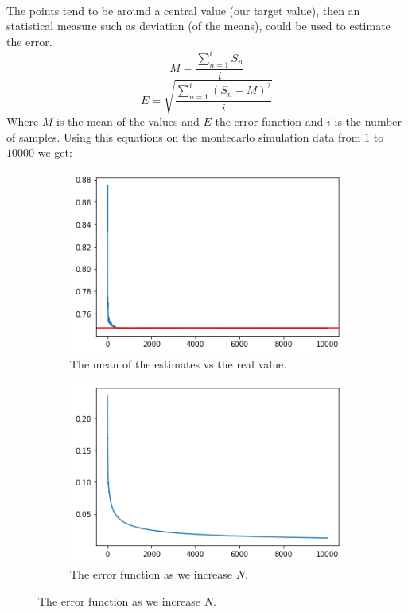 \documentclass{article}
\begin{document}
\paragraph{}The points tend to be around a central value (our target value), then an statistical measure such as deviation (of the means), could be used to estimate the error.
\begin{equation}
	M = \frac{\sum_{n=1}^{i}S_n}{i} 
\end{equation}
\begin{equation}
	E = \sqrt{\frac{\sum_{n=1}^{i} (S_n - M)^2}{i}}	
\end{equation}
Where $M$ is the mean of the values and $E$ the error function and $i$ is the number of samples. Using this equations on the montecarlo simulation data from $1$ to $10000$ we get:
\begin{figure}[h!]
	\centering
	\begin{subfigure}[b]{0.45\linewidth}
		\includegraphics[width=\linewidth]{means_vs_real.png}
		\caption{The mean of the estimates vs the real value.}
	\end{subfigure}
	\begin{subfigure}[b]{0.45\linewidth}
		\includegraphics[width=\linewidth]{error_fn.png}
		\caption{The error function as we increase $N$.}
	\end{subfigure}
\end{figure}
\end{document}
